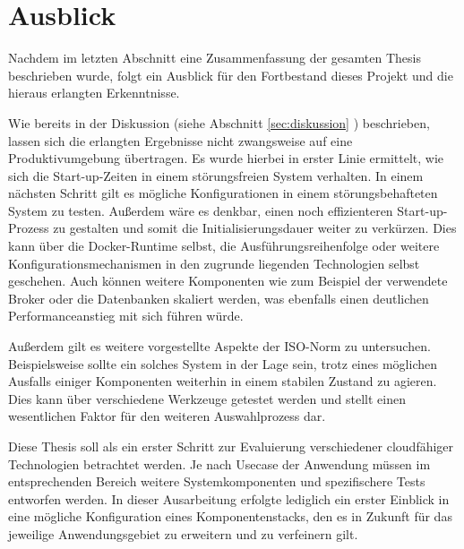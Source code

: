 \chapter{Ausblick}

Nachdem im letzten Abschnitt eine Zusammenfassung der gesamten Thesis beschrieben wurde, folgt ein Ausblick für den Fortbestand dieses Projekt und die hieraus erlangten Erkenntnisse.

Wie bereits in der Diskussion (siehe Abschnitt \ref{sec:diskussion} ) beschrieben, lassen sich die erlangten Ergebnisse nicht zwangsweise auf eine Produktivumgebung übertragen. Es wurde hierbei in erster Linie ermittelt, wie sich die Start-up-Zeiten in einem störungsfreien System verhalten. In einem nächsten Schritt gilt es mögliche Konfigurationen in einem störungsbehafteten System zu testen. Außerdem wäre es denkbar, einen noch effizienteren Start-up-Prozess zu gestalten und somit die Initialisierungsdauer weiter zu verkürzen. Dies kann über die Docker-Runtime selbst, die Ausführungsreihenfolge oder weitere Konfigurationsmechanismen in den zugrunde liegenden Technologien selbst geschehen. Auch können weitere Komponenten wie zum Beispiel der verwendete Broker oder die Datenbanken skaliert werden, was ebenfalls einen deutlichen Performanceanstieg mit sich führen würde.

Außerdem gilt es weitere vorgestellte Aspekte der ISO-Norm zu untersuchen. Beispielsweise sollte ein solches System in der Lage sein, trotz eines möglichen Ausfalls einiger Komponenten weiterhin in einem stabilen Zustand zu agieren. Dies kann über verschiedene Werkzeuge getestet werden und stellt einen wesentlichen Faktor für den weiteren Auswahlprozess dar. 

Diese Thesis soll als ein erster Schritt zur Evaluierung verschiedener cloudfähiger Technologien betrachtet werden. Je nach Usecase der Anwendung müssen im entsprechenden Bereich weitere Systemkomponenten und spezifischere Tests entworfen werden. In dieser Ausarbeitung erfolgte lediglich ein erster Einblick in eine mögliche Konfiguration eines Komponentenstacks, den es in Zukunft für das jeweilige Anwendungsgebiet zu erweitern und zu verfeinern gilt.
